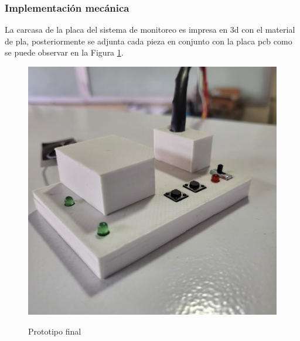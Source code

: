 \subsubsection{Implementación mecánica}
La carcasa de la placa del sistema de monitoreo es impresa en 3d con el material de \acrshort{pla}, posteriormente se adjunta cada pieza en conjunto con la placa \acrshort{pcb} como se puede observar en la Figura \ref{fig:car}.
\begin{figure}[!htb]
    \centering
    \caption{Prototipo final} %
    {\includegraphics[width=0.6\columnwidth]{Figuras/implementacion/mec1.jpg}}\\
    \label{fig:car}
\end{figure}

